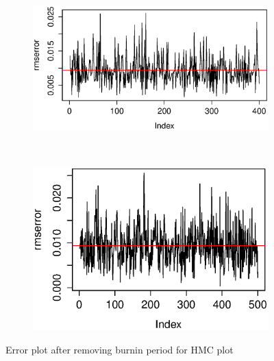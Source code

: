 \documentclass[a4paper,11pt]{article}
\begin{document}
\begin{figure}[H]
    \begin{subfigure}[b]{0.4\textwidth}
            \includegraphics[width=\textwidth]{rmserror10.eps}
    \end{subfigure}
    ~
    \begin{subfigure}[b]{0.4\textwidth}
            \includegraphics[width=\textwidth]{rmserror11.eps}
    \end{subfigure}
    \caption{Error plot after removing burnin period for HMC plot} 
\end{figure}
\end{document}
